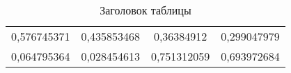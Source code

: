 \begin{table}[!h]
    \begin{center}
        \caption[Заголовок, который будет в списке таблиц]{Заголовок таблицы}\label{tab:1}
        \begin{tabular}{|c|c|c|c|}
            \hline
            0,576745371 & 0,435853468 & 0,36384912  & 0,299047979 \\
            0,064795364 & 0,028454613 & 0,751312059 & 0,693972684 \\
            \hline
        \end{tabular}
    \end{center}
\end{table}


